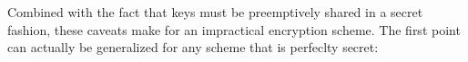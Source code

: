 

Combined with the fact that keys must be preemptively shared in a secret fashion, these caveats make for an impractical encryption scheme. The first point can actually be generalized for any scheme that is perfeclty secret:

